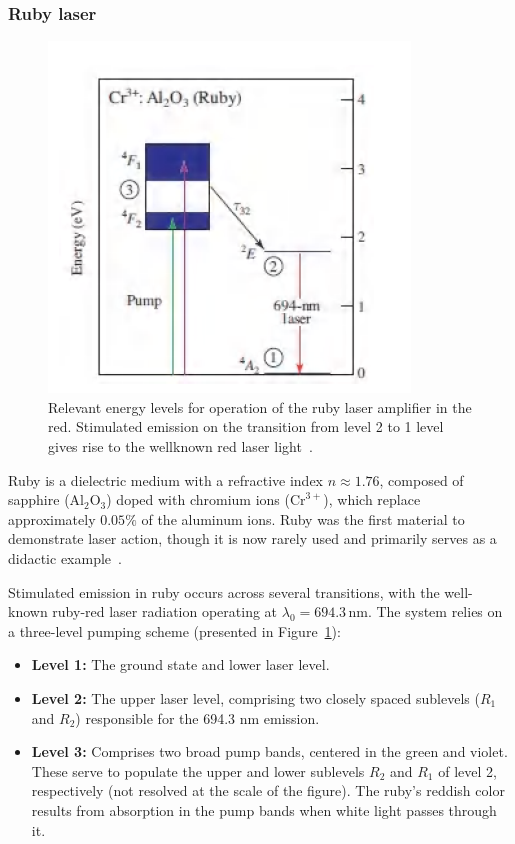 \documentclass[prl,twocolumn]{revtex4-1}
\begin{document}
\subsubsection{\textbf{Ruby laser}}
\begin{figure}
    \centering
    \includegraphics[width=0.75\linewidth]{Images/ruby.png}
    \caption{Relevant energy levels for operation of the ruby laser amplifier in the red. Stimulated emission on the transition from level 2 to 1 level gives rise to the wellknown red laser light~\cite{Saleh2007}.}
    \label{fig:ruby}
\end{figure}

Ruby is a dielectric medium with a refractive index \(n \approx 1.76\), composed of sapphire (\(\text{Al}_2\text{O}_3\)) doped with chromium ions (\(\text{Cr}^{3+}\)), which replace approximately \(0.05\%\) of the aluminum ions. Ruby was the first material to demonstrate laser action, though it is now rarely used and primarily serves as a didactic example~\cite{Saleh2007}.

Stimulated emission in ruby occurs across several transitions, with the well-known ruby-red laser radiation operating at \(\lambda_0 = 694.3 \, \text{nm}\). The system relies on a three-level pumping scheme (presented in Figure~\ref{fig:ruby}):
%
\begin{itemize}
  \item \textbf{Level 1:} The ground state and lower laser level.
  \item \textbf{Level 2:} The upper laser level, comprising two closely spaced sublevels ($R_1$ and $R_2$) responsible for the 694.3 nm emission.
  \item \textbf{Level 3:} Comprises two broad pump bands, centered in the green and violet. These serve to populate the upper and lower sublevels $R_2$ and $R_1$ of level 2, respectively (not resolved at the scale of the figure). The ruby's reddish color results from absorption in the pump bands when white light passes through it.
\end{itemize}
%
\end{document}
